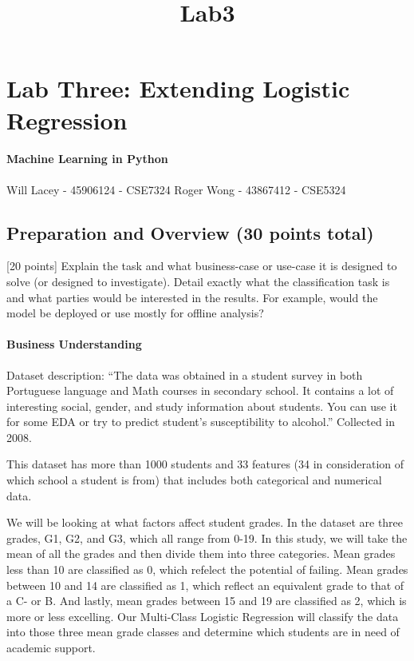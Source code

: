 \documentclass[11pt]{article}
\title{Lab3}
\begin{document}
    
    
    \maketitle
    
    

    
    \section{Lab Three: Extending Logistic
Regression}\label{lab-three-extending-logistic-regression}

\paragraph{Machine Learning in Python}\label{machine-learning-in-python}

Will Lacey - 45906124 - CSE7324 Roger Wong - 43867412 - CSE5324

    \subsection{Preparation and Overview (30 points
total)}\label{preparation-and-overview-30-points-total}

 {[}20 points{]} Explain the task and what business-case or use-case it
is designed to solve (or designed to investigate). Detail exactly what
the classification task is and what parties would be interested in the
results. For example, would the model be deployed or use mostly for
offline analysis? 

    \paragraph{Business Understanding}\label{business-understanding}

Dataset description: ``The data was obtained in a student survey in both
Portuguese language and Math courses in secondary school. It contains a
lot of interesting social, gender, and study information about students.
You can use it for some EDA or try to predict student's susceptibility
to alcohol.'' Collected in 2008.

This dataset has more than 1000 students and 33 features (34 in
consideration of which school a student is from) that includes both
categorical and numerical data.

We will be looking at what factors affect student grades. In the dataset
are three grades, G1, G2, and G3, which all range from 0-19. In this
study, we will take the mean of all the grades and then divide them into
three categories. Mean grades less than 10 are classified as 0, which
refelect the potential of failing. Mean grades between 10 and 14 are
classified as 1, which reflect an equivalent grade to that of a C- or B.
And lastly, mean grades between 15 and 19 are classified as 2, which is
more or less excelling. Our Multi-Class Logistic Regression will
classify the data into those three mean grade classes and determine
which students are in need of academic support.
\end{document}
